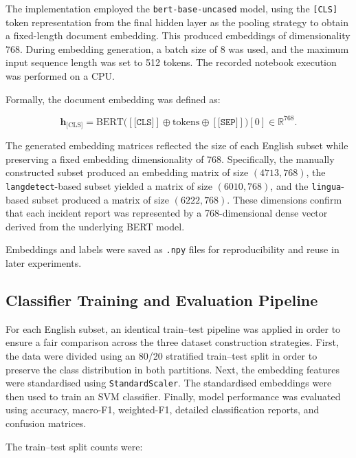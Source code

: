 \documentclass[11pt, titlepage, bibliography=totoc]{scrreprt}
\begin{document}
The implementation employed the \texttt{bert-base-uncased} model, using the \texttt{[CLS]} token representation from the final hidden layer as the pooling strategy to obtain a fixed-length document embedding. This produced embeddings of dimensionality 768. During embedding generation, a batch size of 8 was used, and the maximum input sequence length was set to 512 tokens. The recorded notebook execution was performed on a CPU.

Formally, the document embedding was defined as:

\begin{equation}
\mathbf{h}_{\text{[CLS]}} = \text{BERT}\big([\texttt{[CLS]}] \oplus \text{tokens} \oplus [\texttt{[SEP]}]\big)[0] \in \mathbb{R}^{768}.
\end{equation}

The generated embedding matrices reflected the size of each English subset while preserving a fixed embedding dimensionality of 768. Specifically, the manually constructed subset produced an embedding matrix of size $(4713, 768)$, the \texttt{langdetect}-based subset yielded a matrix of size $(6010, 768)$, and the \texttt{lingua}-based subset produced a matrix of size $(6222, 768)$. These dimensions confirm that each incident report was represented by a 768-dimensional dense vector derived from the underlying BERT model.

Embeddings and labels were saved as \texttt{.npy} files for reproducibility and reuse in later experiments.

\subsection{Classifier Training and Evaluation Pipeline}

For each English subset, an identical train--test pipeline was applied in order to ensure a fair comparison across the three dataset construction strategies. First, the data were divided using an 80/20 stratified train--test split in order to preserve the class distribution in both partitions. Next, the embedding features were standardised using \texttt{StandardScaler}. The standardised embeddings were then used to train an SVM classifier. Finally, model performance was evaluated using accuracy, macro-F1, weighted-F1, detailed classification reports, and confusion matrices.


The train--test split counts were:
\end{document}
